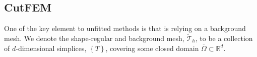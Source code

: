 \subsection{CutFEM }%
\label{sub:cutfem}


One of the key element to unfitted methods is that is relying on a background mesh. We denote the shape-regular and background mesh, $\widetilde{\mathcal{T}}_{h} $, to be a collection of $d$-dimensional simplices, $\left\{ T \right\} $, covering some closed domain
$\overline{\Omega } \subset \mathbb{R} ^{d} $.












